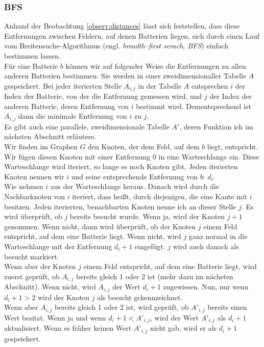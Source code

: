 \documentclass[a4paper,10pt,ngerman]{scrartcl}
\begin{document}
\subsubsection{BFS}
Anhand der Beobachtung \ref{observ:distances} lässt sich feststellen, dass diese Entfernungen zwischen Feldern,
auf denen Batterien liegen, sich durch einen Lauf vom Breitensuche-Algorithmus 
(engl. \textit{breadth--first serach, BFS}) einfach bestimmen lassen.\\

Für eine Batterie $b$ können wir auf folgender Weise die Entfernungen zu allen anderen Batterien bestimmen.
Sie werden in einer zweidimensionaller Tabelle $A$ gespeichert.
Bei jeder iterierten Stelle $A_{i,j}$ in der Tabelle $A$ entsprechen $i$ der Index der Batterie,
von der die Entfernung gemessen wird, und $j$ der Index der anderen Batterie, deren Entfernung von $i$ bestimmt wird.
Dementsprechend ist $A_{i,j}$ dann die minimale Entfernung von $i$ zu $j$.\\
Es gibt auch eine parallele, zweidimensionale Tabelle $A'$, deren Funktion ich im nächsten Abschnitt erläutere.\\
Wir finden im Graphen $G$ den Knoten, der dem Feld, auf dem $b$ liegt, entspricht.
Wir fügen diesen Knoten mit einer Entfernung 0 in eine Warteschlange ein.
Diese Warteschlange wird iteriert, so lange es noch Knoten gibt.
Jeden iterierten Knoten nennen wir $i$ und seine entsprechende Entfernung von $b$: $d_i$.\\
Wie nehmen $i$ aus der Warteschlange heraus. 
Danach wird durch die Nachbarknoten von $i$ iteriert, dass heißt, durch diejenigen, die eine Kante mit $i$ besitzen.
Jeden iterierten, benachbarten Knoten nenne ich an dieser Stelle $j$.
Es wird überprüft, ob $j$ bereits besucht wurde. Wenn ja, wird der Knoten $j+1$ genommen.
Wenn nicht, dann wird überprüft, ob der Knoten $j$ einem Feld entspricht, auf dem eine Batterie liegt.
Wenn nicht, wird $j$ ganz normal in die Warteschlange mit der Entfernung $d_i + 1$ eingefügt.
$j$ wird auch danach als besucht markiert.\\
Wenn aber der Knoten $j$ einem Feld entspricht, auf dem eine Batterie liegt, wird zuerst geprüft,
ob $A_{i,j}$ bereits gleich 1 oder 2 ist (mehr dazu im nächsten Abschnitt).
Wenn nicht, wird $A_{i,j}$ der Wert $d_i + 1$ zugewiesen. Nun, nur wenn $d_i + 1 > 2$ wird der Knoten $j$ als
besucht gekennzeichnet.\\
Wenn aber $A_{i,j}$ bereits gleich 1 oder 2 ist, wird geprüft, ob $A'_{i,j}$ bereits einen Wert besitzt.
Wenn ja und wenn $d_i + 1 < A'_{i,j}$, wird der Wert $A'_{i,j}$ als $d_i + 1$ aktualisiert. 
Wenn es früher keinen Wert $A'_{i,j}$ nicht gab, wird er als $d_i + 1$ gespeichert.\\
\end{document}

